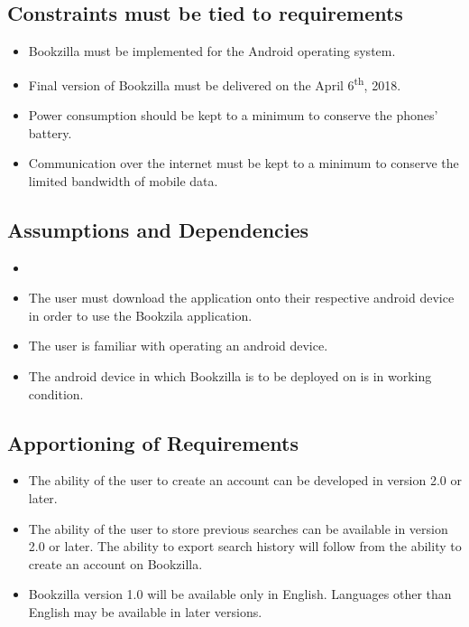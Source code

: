 \documentclass[12pt, titlepage, a4paper]{article}
\begin{document}
\subsection{Constraints must be tied to requirements}
\label{sub:constraints}
\begin{itemize}
    \item Bookzilla must be implemented for the Android operating system.
    \item Final version of Bookzilla must be delivered on the April 6\textsuperscript{th}, 2018.
    \item Power consumption should be kept to a minimum to conserve the phones' battery.
    \item Communication over the internet must be kept to a minimum to conserve the limited bandwidth of mobile data.
\end{itemize}

\subsection{Assumptions and Dependencies}
\label{sub:assumptions_and_dependencies}
\begin{itemize}
    \item 
	\item The user must download the application onto their respective android device in order to use the Bookzila application.
	\item The user is familiar with operating an android device.
	\item The android device in which Bookzilla is to be deployed on is in working condition.
\end{itemize}

\subsection{Apportioning of Requirements}
\label{sub:apportioning_of_requirements}
\begin{itemize}
	\item The ability of the user to create an account can be developed in version 2.0 or later.
	\item The ability of the user to store previous searches can be available in version 2.0 or later. 
	The ability to export search history will follow from the ability to create an account on Bookzilla.
	\item Bookzilla version 1.0 will be available only in English. Languages other than English may be available in later versions.
\end{itemize}
\end{document}
